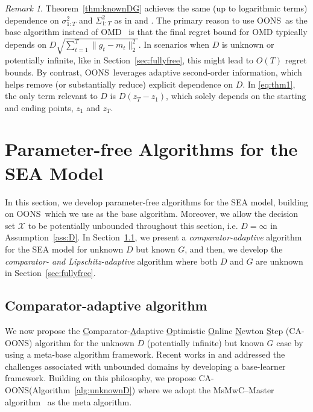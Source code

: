 \documentclass{article}
\renewcommand{\citet}{\citep}
\theoremstyle{plain}
\theoremstyle{definition}
\theoremstyle{remark}
\newtheorem{remark}[theorem]{Remark}
\newcommand{\cX}{\mathcal{X}}
\newcommand{\oons}{{\sc OONS}}
\newcommand{\cawe}{{\sc CA-OONS}}
\begin{document}
\begin{remark}
 Theorem~\ref{thm:knownDG} achieves the same (up to logarithmic terms)  dependence on 
$\sigma_{1:T}^2$ and $\Sigma_{1:T}^2$ as in \citet{sachs2023accelerated} and \citet{chen2024optimistic}. The primary reason to use \oons\ as the base algorithm instead of OMD~\cite{chen2024optimistic} is that the final regret bound for OMD typically depends on $D \sqrt{\sum_{t=1}^T \| g_t - m_t \|_2^2}$. In scenarios when $D$ is unknown or potentially infinite, like in Section~\ref{sec:fullyfree}, this might lead to $O(T)$ regret bounds. By contrast, \oons\ leverages adaptive second-order information, which helps remove (or substantially reduce) explicit dependence on $D$. In \eqref{eq:thm1}, the only term relevant to $D$ is $D(z_T - z_1)$, which solely depends on the starting and ending points, $z_1$ and $z_T$. %
\end{remark}

\section{Parameter-free Algorithms for the SEA Model}
In this section, we develop parameter-free algorithms for the SEA model, building on \oons\ which we use as the base algorithm. Moreover, we allow the decision set $\cX$ to be potentially unbounded throughout this section, i.e. $D=\infty$ in Assumption~\ref{ass:D}. In Section~\ref{sec:unknownD}, we present a \emph{comparator-adaptive} algorithm for the SEA model for unknown $D$ but known $G$, and then, we develop the \emph{comparator- and Lipschitz-adaptive} algorithm where both $D$ and $G$ are unknown in Section~\ref{sec:fullyfree}.

\subsection{Comparator-adaptive algorithm}\label{sec:unknownD}
We  now propose the \underline{C}omparator-\underline{A}daptive \underline{O}ptimistic \underline{O}nline \underline{N}ewton \underline{S}tep (\cawe) algorithm for the unknown $D$ (potentially infinite) but known $G$ case by using a meta-base algorithm framework. Recent works in \citet{chen2021impossible} and \citet{jacobsen2023unconstrained}  addressed the challenges associated with unbounded domains by developing  a base-learner framework. Building on this philosophy, we propose \cawe (Algorithm~\ref{alg:unknownD}) where we adopt the MsMwC--Master algorithm~\cite{chen2021impossible} as the meta algorithm.
\end{document}
